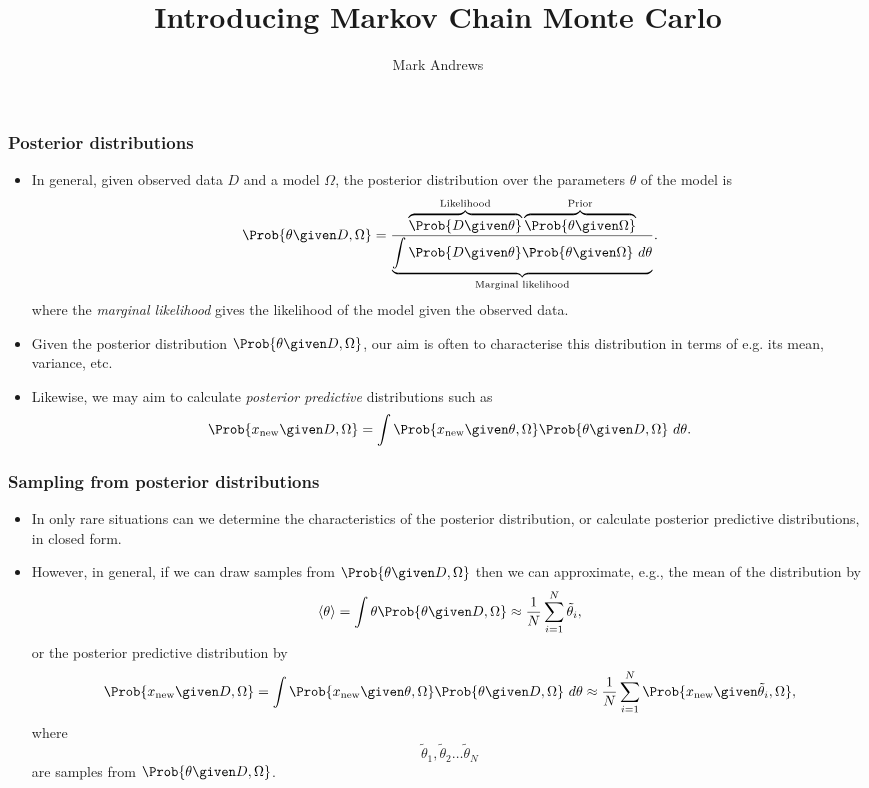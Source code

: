 \documentclass{slides}
\title[MCMC]{Introducing Markov Chain Monte Carlo}
\author[Andrews]{Mark Andrews}
\date{}
\begin{document}
{
	\begin{frame}
		\titlepage
	\end{frame}
}


\begin{frame}
	\frametitle{Posterior distributions}
	\begin{itemize}

		\item In general, given observed data $D$ and a model $\Omega$, the posterior distribution over the parameters $\theta$ of the model is
		\[
			\Prob{\theta\given D, \Omega}
			= \frac{\overbrace{\Prob{D\given\theta}}^{\text{Likelihood}}\overbrace{\Prob{\theta\given\Omega}}^{\text{Prior}}}
			{\underbrace{\int\Prob{D\given\theta}\Prob{\theta\given\Omega}\ d\theta}_{\text{Marginal likelihood}}}.
		\]
		where the \emph{marginal likelihood} gives the likelihood of the model given the observed data.

	\item Given the posterior distribution $\Prob{\theta\given D, \Omega}$, our aim is often to characterise this distribution in terms of e.g. its mean, variance, etc. 
	\item Likewise, we may aim to calculate \emph{posterior predictive} distributions such as 
		\[
			\Prob{x_{\text{new}} \given D, \Omega} = \int\Prob{x_{\text{new}}\given\theta,\Omega}\Prob{\theta\given D, \Omega}\ d\theta.
		\]

	\end{itemize}
\end{frame}

\begin{frame}
	\frametitle{Sampling from posterior distributions}
	\begin{itemize}

		\item In only rare situations can we determine the characteristics of the posterior distribution, or calculate posterior predictive distributions, in closed form.
		\item However, in general, if we can draw samples from $\Prob{\theta\given D, \Omega}$ then we can approximate, e.g., the mean of the distribution by
			\[
				\langle\theta\rangle = \int\theta\Prob{\theta\given D, \Omega} \approx \frac{1}{N} \sum_{i=1}^N \tilde{\theta}_i,
			\]
		or the posterior predictive distribution by 
		\[
			\Prob{x_{\text{new}} \given D, \Omega} = \int\Prob{x_{\text{new}}\given\theta,\Omega}\Prob{\theta\given D, \Omega}\ d\theta
			\approx \frac{1}{N} \sum_{i=1}^N \Prob{x_{\text{new}}\given\tilde{\theta}_i,\Omega},
		\]
		where \[\tilde{\theta}_1, \tilde{\theta}_2 \ldots \tilde{\theta}_N\] are samples from $\Prob{\theta\given D, \Omega}$.
	\end{itemize}
\end{frame}
\end{document}
